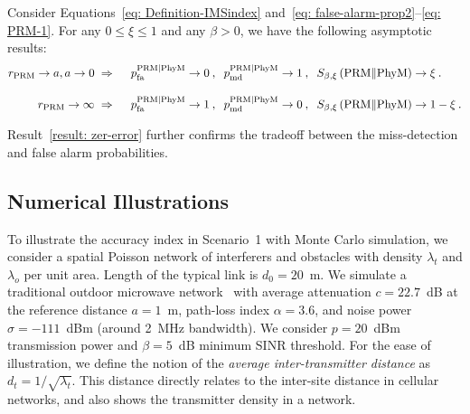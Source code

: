 \documentclass[12pt, draftclsnofoot, onecolumn]{IEEEtran}
\begin{document}
\begin{result}\label{result: zer-error}
Consider Equations~\eqref{eq: Definition-IMSindex} and~\eqref{eq: false-alarm-prop2}--\eqref{eq: PRM-1}. For any $0 \leq \xi \leq 1$ and any $\beta > 0$, we have the following asymptotic results:
\begin{alignat*}{3}
r_{\mathrm{PRM}} \to a , a \to 0 \hspace{1mm} &\Rightarrow &&\hspace{2mm} p_{\mathrm{fa}}^{{\mathrm{PRM}} \mid {\mathrm{PhyM}}} \to 0 \:, \hspace{2mm} p_{\mathrm{md}}^{{\mathrm{PRM}} \mid {\mathrm{PhyM}}} \to 1 \:, \hspace{2mm}  S_{\beta,\xi}\left(\mathrm{PRM}\|\mathrm{PhyM} \right) \to \xi
\:. \\ \nonumber \\[-2mm]
r_{\mathrm{PRM}} \to \infty \hspace{1mm} &\Rightarrow && \hspace{2mm} p_{\mathrm{fa}}^{{\mathrm{PRM}} \mid {\mathrm{PhyM}}} \to 1 \:, \hspace{2mm} p_{\mathrm{md}}^{{\mathrm{PRM}} \mid {\mathrm{PhyM}}} \to 0\:,  \hspace{2mm}   S_{\beta,\xi}\left(\mathrm{PRM}\|\mathrm{PhyM} \right) \to 1 - \xi
\:.
\end{alignat*}
\end{result}
Result~\ref{result: zer-error} further confirms the tradeoff between the miss-detection and false alarm probabilities.

\subsection{Numerical Illustrations}\label{sec: NumericalReults1}
To illustrate the accuracy index in Scenario~1 with Monte Carlo simulation, we consider a spatial Poisson network of interferers and obstacles with density $\lambda_t$ and $\lambda_o$ per unit area. Length of the typical link is $d_0 = 20$~m. We simulate a traditional outdoor microwave network~\cite{di2014stochastic} with average attenuation $c=22.7$~dB at the reference distance $a=1$~m, path-loss index $\alpha=3.6$, and noise power $\sigma = -111$~dBm (around 2~MHz bandwidth). We consider $p=20$~dBm transmission power and $\beta = 5$~dB minimum SINR threshold. For the ease of illustration, we define the notion of the \emph{average inter-transmitter distance} as $d_t = 1/\sqrt{\lambda_t}$. This distance directly relates to the inter-site distance in cellular networks, and also shows the transmitter density in a network.
\end{document}

